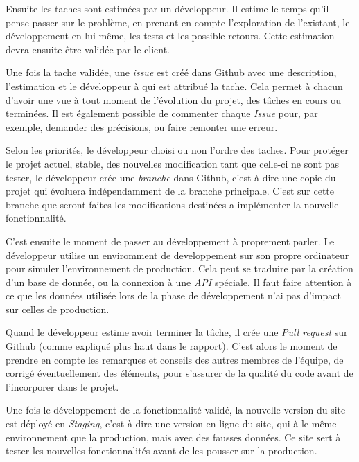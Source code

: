 \bigskip

Ensuite les taches sont estimées par un développeur. Il estime le temps
qu'il pense passer sur le problème, en prenant en compte l'exploration
de l'existant, le développement en lui-même, les tests et les possible
retours. Cette estimation devra ensuite être validée par le client.

\bigskip

Une fois la tache validée, une \emph{issue} est créé dans Github avec
une description, l'estimation et le développeur à qui est attribué la
tache. Cela permet à chacun d'avoir une vue à tout moment de l'évolution
du projet, des tâches en cours ou terminées. Il est également possible
de commenter chaque \emph{Issue} pour, par exemple, demander des
précisions, ou faire remonter une erreur.

\bigskip

Selon les priorités, le développeur choisi ou non l'ordre des taches.
Pour protéger le projet actuel, stable, des nouvelles modification tant
que celle-ci ne sont pas tester, le développeur crée une \emph{branche}
dans Github, c'est à dire une copie du projet qui évoluera
indépendamment de la branche principale. C'est sur cette branche que
seront faites les modifications destinées a implémenter la nouvelle
fonctionnalité.

\bigskip

C'est ensuite le moment de passer au développement à proprement parler.
Le développeur utilise un enviromment de developpement sur son propre
ordinateur pour simuler l'environnement de production. Cela peut se
traduire par la création d'un base de donnée, ou la connexion à une
\emph{API} spéciale. Il faut faire attention à ce que les données
utilisée lors de la phase de développement n'ai pas d'impact sur celles
de production.

\bigskip

Quand le développeur estime avoir terminer la tâche, il crée une
\emph{Pull request} sur Github (comme expliqué plus haut dans le
rapport). C'est alors le moment de prendre en compte les remarques et
conseils des autres membres de l'équipe, de corrigé éventuellement des
éléments, pour s'assurer de la qualité du code avant de l'incorporer
dans le projet.

\bigskip

Une fois le développement de la fonctionnalité validé, la nouvelle
version du site est déployé en \emph{Staging}, c'est à dire une version
en ligne du site, qui à le même environnement que la production, mais
avec des fausses données. Ce site sert à tester les nouvelles
fonctionnalités avant de les pousser sur la production.

